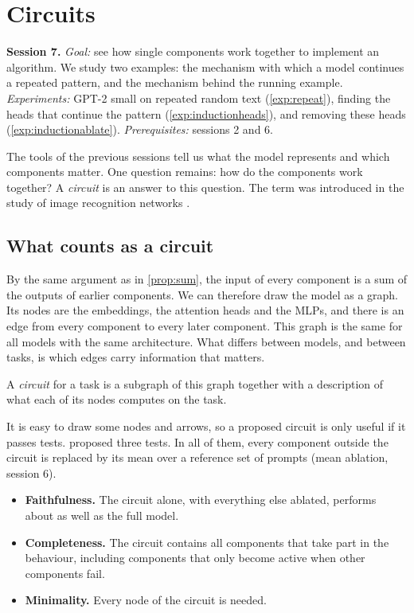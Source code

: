 \section{Circuits}
\label{sec:circuits}

\begin{sessioncard}
\textbf{Session 7.} \emph{Goal:} see how single components work together to implement an algorithm. We study two
examples: the mechanism with which a model continues a repeated pattern, and the mechanism behind the running
example.
\emph{Experiments:} GPT-2 small on repeated random text (\cref{exp:repeat}), finding the heads that continue the
pattern (\cref{exp:inductionheads}), and removing these heads (\cref{exp:inductionablate}).
\emph{Prerequisites:} sessions 2 and 6.
\end{sessioncard}

The tools of the previous sessions tell us what the model represents and which components matter. One question
remains: how do the components work together? A \emph{circuit} is an answer to this question. The term was
introduced in the study of image recognition networks \citep{olah2020zoom}.

\subsection{What counts as a circuit}

By the same argument as in \cref{prop:sum}, the input of every component is a sum of the outputs of earlier
components. We can therefore draw the model as a graph. Its nodes are the embeddings, the attention heads and the
MLPs, and there is an edge from every component to every later component. This graph is the same for all models
with the same architecture. What differs between models, and between tasks, is which edges carry information that
matters.

\begin{definition}[Circuit]\label{def:circuit}
A \emph{circuit} for a task is a subgraph of this graph together with a description of what each of its nodes
computes on the task.
\end{definition}

It is easy to draw some nodes and arrows, so a proposed circuit is only useful if it passes tests.
\citet{wang2023interpretability} proposed three tests. In all of them, every component outside the circuit is
replaced by its mean over a reference set of prompts (mean ablation, session 6).
\begin{itemize}
\item \textbf{Faithfulness.} The circuit alone, with everything else ablated, performs about as well as the
full model.
\item \textbf{Completeness.} The circuit contains all components that take part in the behaviour, including
components that only become active when other components fail.
\item \textbf{Minimality.} Every node of the circuit is needed.
\end{itemize}


